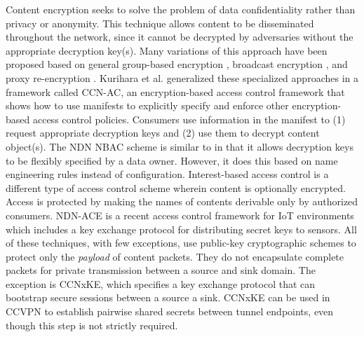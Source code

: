 Content encryption seeks to solve the problem of data confidentiality rather than
privacy or anonymity. This technique allows content to be disseminated throughout
the network, since it cannot be decrypted by adversaries without the appropriate decryption key(s).
Many variations of this approach have been proposed based on general
group-based encryption \cite{Smetters2010}, broadcast encryption \cite{Misra2013,Ion2013}, and
proxy re-encryption \cite{Wood2014}. Kurihara et al. \cite{ifip15} generalized these specialized
approaches in a framework called CCN-AC, an encryption-based access control framework
that shows how to use manifests to explicitly specify and enforce other encryption-based
access control policies. Consumers use information in the manifest to (1) request appropriate
decryption keys and (2) use them to decrypt content object(s). The NDN NBAC \cite{yu2015name}
scheme is similar to \cite{ifip15} in that it allows decryption keys to be
flexibly specified by a data owner. However, it does this based on name engineering rules instead of
configuration. Interest-based access control \cite{ghali2015interest} is a different
type of access control scheme wherein content is optionally encrypted. Access
is protected by making the names of contents derivable only by authorized consumers.
NDN-ACE \cite{shangndn} is a recent access control framework for IoT environments
which includes a key exchange protocol for distributing secret keys to sensors.
All of these techniques, with few exceptions, use public-key cryptographic schemes
to protect only the \emph{payload} of content packets. They do not encapsulate complete
packets for private transmission between a source and sink domain. The exception is CCNxKE\cite{ccnxke}, 
which specifies a key exchange protocol that can bootstrap secure sessions between a source
a sink. CCNxKE can be used in CCVPN to establish pairwise shared secrets between tunnel
endpoints, even though this step is not strictly required.
